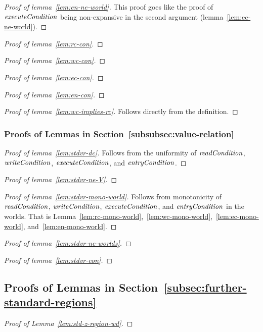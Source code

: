 \documentclass[a4paper]{article}
\newcommand{\plainfun}[2]{
  \ifthenelse{\equal{#2}{}}
             {\mathit{#1}}
             {\mathit{#1}(#2)}
}
\newcommand{\readCond}[1]{\plainfun{readCondition}{#1}}
\newcommand{\writeCond}[1]{\plainfun{writeCondition}{#1}}
\newcommand{\execCond}[1]{\plainfun{executeCondition}{#1}}
\newcommand{\entryCond}[1]{\plainfun{entryCondition}{#1}}
\begin{document}
\begin{appendices}
\begin{proof}[Proof of lemma~\ref{lem:en-ne-world}]
  This proof goes like the proof of $\execCond{}$ being non-expansive in the second argument (lemma~\ref{lem:ec-ne-world}).
\end{proof}
 
\begin{proof}[Proof of lemma~\ref{lem:rc-con}]
\end{proof}

\begin{proof}[Proof of lemma~\ref{lem:wc-con}]
\end{proof}

\begin{proof}[Proof of lemma~\ref{lem:ec-con}]
\end{proof}

\begin{proof}[Proof of lemma~\ref{lem:en-con}]
\end{proof}

\begin{proof}[Proof of lemma~\ref{lem:wc-implies-rc}]
  Follows directly from the definition.
\end{proof}


\subsubsection{Proofs of Lemmas in Section~\ref{subsubsec:value-relation}}
\begin{proof}[Proof of lemma~\ref{lem:stdvr-dc}]
  Follows from the uniformity of $\readCond{}$, $\writeCond{}$, $\execCond{}$, and $\entryCond{}$.
\end{proof}

\begin{proof}[Proof of lemma~\ref{lem:stdvr-ne-V}]
\end{proof}

\begin{proof}[Proof of lemma~\ref{lem:stdvr-mono-world}]
  Follows from monotonicity of $\readCond{}$, $\writeCond{}$, $\execCond{}$, and $\entryCond{}$ in the worlds. That is Lemma~\ref{lem:rc-mono-world},~\ref{lem:wc-mono-world},~\ref{lem:ec-mono-world}, and~\ref{lem:en-mono-world}.
\end{proof}

\begin{proof}[Proof of lemma~\ref{lem:stdvr-ne-worlds}]
\end{proof}

\begin{proof}[Proof of lemma~\ref{lem:stdvr-con}]
\end{proof}


\subsection{Proofs of Lemmas in Section~\ref{subsec:further-standard-regions}}


\begin{proof}[Proof of Lemma~\ref{lem:std-z-region-wd}]
\end{proof}
\end{appendices}
\end{document}
